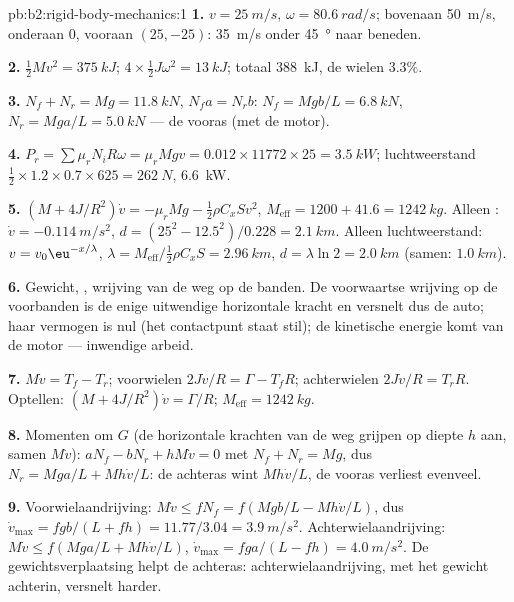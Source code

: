 \begin{solution}{pb:b2:rigid-body-mechanics:1}
\textbf{1.} $v = \qty{25}{m/s}$, $\omega = \qty{80.6}{rad/s}$; bovenaan
\qty{50}{m/s}, onderaan $0$, vooraan $(25, -25)$: \qty{35}{m/s} onder
\qty{45}{\degree} naar beneden.

\textbf{2.} $\tfrac12Mv^2 = \qty{375}{kJ}$;
$4 \times \tfrac12J\omega^2 = \qty{13}{kJ}$; totaal \qty{388}{kJ}, de wielen
$3.3\%$.

\textbf{3.} $N_f + N_r = Mg = \qty{11.8}{kN}$, $N_fa = N_rb$:
$N_f = Mgb/L =
\qty{6.8}{kN}$, $N_r = Mga/L = \qty{5.0}{kN}$ --- de vooras
(met de motor).

\textbf{4.}
$P_r = \sum\mu_rN_iR\omega = \mu_rMgv = 0.012 \times 11772 \times 25 =
\qty{3.5}{kW}$;
luchtweerstand $\tfrac12 \times 1.2 \times 0.7 \times 625 = \qty{262}{N}$,
\qty{6.6}{kW}.

\textbf{5.} $(M + 4J/R^2)\dot v = -\mu_rMg - \tfrac12\rho C_xSv^2$,
$M_{\text{eff}} =
1200 + 41.6 = \qty{1242}{kg}$. Alleen :
$\dot v = \qty{-0.114}{m/s^2}$, $d = (25^2 - 12.5^2)/0.228 = \qty{2.1}{km}$.
Alleen luchtweerstand: $v = v_0\eu^{-x/\lambda}$,
$\lambda = M_{\text{eff}}/\tfrac12\rho C_xS = \qty{2.96}{km}$,
$d = \lambda\ln2 =
\qty{2.0}{km}$ (samen: $\qty{1.0}{km}$).

\textbf{6.} Gewicht, , wrijving van de weg op de banden. De
voorwaartse wrijving op de voorbanden is de enige uitwendige horizontale
kracht en versnelt dus de auto; haar vermogen is nul (het contactpunt staat
stil); de kinetische energie komt van de motor --- inwendige arbeid.

\textbf{7.} $M\dot v = T_f - T_r$; voorwielen $2J\dot v/R = \Gamma - T_fR$;
achterwielen $2J\dot v/R = T_rR$. Optellen: $(M + 4J/R^2)\dot v = \Gamma/R$;
$M_{\text{eff}} = \qty{1242}{kg}$.

\textbf{8.} Momenten om $G$ (de horizontale krachten van de weg grijpen op
diepte $h$ aan, samen $M\dot v$): $aN_f - bN_r + hM\dot v = 0$ met
$N_f + N_r = Mg$, dus $N_r = Mga/L + Mh\dot v/L$: de achteras wint
$Mh\dot v/L$, de vooras verliest evenveel.

\textbf{9.} Voorwielaandrijving: $M\dot v \le fN_f = f(Mgb/L - Mh\dot v/L)$,
dus $\dot v_{\max} = fgb/(L + fh) = 11.77/3.04 = \qty{3.9}{m/s^2}$.
Achterwielaandrijving: $M\dot v \le f(Mga/L + Mh\dot v/L)$,
$\dot v_{\max} = fga/(L - fh) = \qty{4.0}{m/s^2}$. De gewichtsverplaatsing
helpt de achteras: achterwielaandrijving, met het gewicht achterin, versnelt
harder.


\end{solution}
